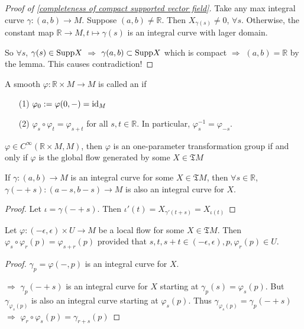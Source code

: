 \begin{proof}[Proof of \ref{completeness of compact supported vector field}]
    Take any max integral curve  $ \gamma:(a,b)\rightarrow M $. Suppose  $ (a,b)\neq\mathbb{R} $. Then  $ X_{\gamma(s)}\neq0 $, $ \forall s $. Otherwise, the constant map  $ \mathbb{R}\rightarrow M,t\mapsto \gamma(s) $ is an integral curve with lager domain.
    
    So  $ \forall s $,  $ \gamma(s)\in \mathrm{Supp} X $ $ \Rightarrow  $ $ \gamma(a,b)\subset \mathrm{Supp} X $ which is compact  $ \Rightarrow $  $ (a,b)=\mathbb{R} $ by the lemma. This causes contradiction!      
\end{proof}
A smooth  $ \varphi:\mathbb{R}\times M\rightarrow M $ is called an  if 
\begin{enumerate}
    \item[(1)]  $ \varphi_0:=\varphi(0,-)=\mathrm{id}_M $ 
    \item[(2)]  $ \varphi_s\circ \varphi_t=\varphi_{s+t} $ for all  $ s,t\in \mathbb{R} $. In particular,  $ \varphi_s^{-1}=\varphi_{-s} $.   
\end{enumerate} 
\begin{theorem}\label{equivalence of one-parameter transformation group}
     $ \varphi\in C^\infty(\mathbb{R}\times M,M) $, then  $ \varphi $ is an one-parameter transformation group if and only if  $ \varphi $ is the global flow generated by some  $ X\in \mathfrak{T}M $   
\end{theorem}
\begin{lemma}
    If  $ \gamma:(a,b)\rightarrow M $ is an integral curve for some  $ X\in \mathfrak{T}M $, then  $ \forall s\in \mathbb{R} $,  $ \gamma(-+s) :(a-s,b-s)\rightarrow M$ is also an integral curve for  $ X$.   
\end{lemma}
\begin{proof}
    Let $ \iota=\gamma(-+s) $. Then  $ \iota'(t)=X_{\gamma'(t+s)}=X_{\iota(t)} $  
\end{proof}
\begin{lemma}
    Let  $ \varphi:(-\epsilon,\epsilon)\times U\rightarrow M $ be a local flow for some  $ X\in \mathfrak{T}M $. Then  $ \varphi_s\circ \varphi_r(p)=\varphi_{s+r}(p) $ provided that  $ s,t,s+t\in (-\epsilon,\epsilon), p,\varphi_r(p)\in U $.    
\end{lemma}
\begin{proof}
     $ \gamma_p=\varphi(-,p) $ is an integral curve for  $ X $.
     
      $ \Rightarrow  $  $ \gamma_p(-+s) $ is an integral curve for  $ X  $ starting at  $ \gamma_p(s)=\varphi_s(p) $. But  $ \gamma_{\varphi_s(p)} $ is also an integral curve starting at  $ \varphi_s(p) $. Thus  $ \gamma_{\varphi_s(p)}=\gamma_p(-+s) $ $ \Rightarrow $  $ \varphi_r\circ \varphi_s(p)=\gamma_{r+s}(p) $     
\end{proof}
